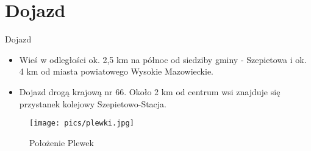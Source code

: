 \documentclass{beamer}
\begin{document}
\section {Dojazd}
\begin{frame}{Dojazd}
\begin{itemize}
\item Wieś w odległości ok. 2,5 km na północ od siedziby gminy - Szepietowa i ok. 4 km od miasta powiatowego Wysokie Mazowieckie.

\item Dojazd drogą krajową nr 66. Około 2 km od centrum wsi znajduje się przystanek kolejowy Szepietowo-Stacja.
\end{itemize}
\end{frame}
\begin{frame}
\begin {center}
\begin{figure}
\texttt{[image: pics/plewki.jpg]}
\caption{Położenie Plewek}\label{fig:plewki}
\end{figure}
\end{center}
\end {frame}
\end{document}
